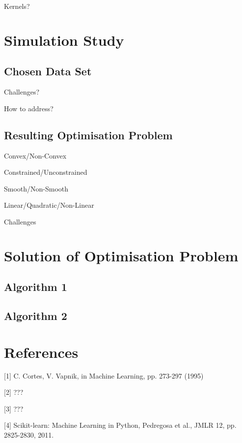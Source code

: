 \documentclass[10pt, a4paper]{amsart}
\begin{document}
Kernels?


\section{Simulation Study}

\subsection{Chosen Data Set}\hfill



Challenges?

How to address?

\subsection{Resulting Optimisation Problem}\hfill

Convex/Non-Convex

Constrained/Unconstrained

Smooth/Non-Smooth

Linear/Quadratic/Non-Linear

Challenges


\section{Solution of Optimisation Problem}

\subsection{Algorithm 1}\hfill

\subsection{Algorithm 2}\hfill


\section{References}

[1] C. Cortes, V. Vapnik, in Machine Learning, pp. 273-297 (1995)

[2] ???

[3] ???

[4] Scikit-learn: Machine Learning in Python, Pedregosa et al., JMLR 12, pp. 2825-2830, 2011.
\end{document}
